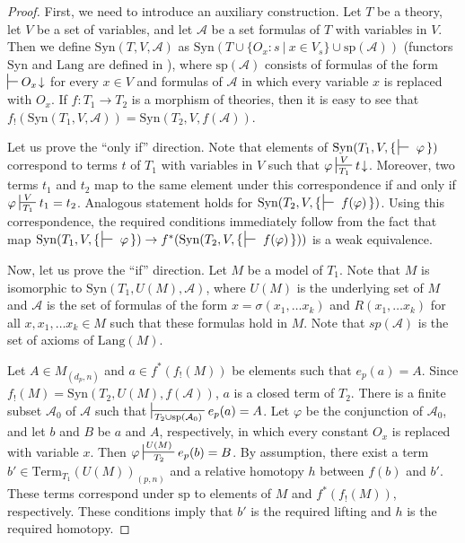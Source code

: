 \documentclass[reqno]{amsart}
\theoremstyle{definition}
\theoremstyle{remark}
\newcommand{\Syn}{\mathrm{Syn}}
\newcommand{\Lang}{\mathrm{Lang}}
\newcommand{\Term}{\mathrm{Term}}
\numberwithin{figure}{section}
\begin{document}
\begin{proof}
First, we need to introduce an auxiliary construction.
Let $T$ be a theory, let $V$ be a set of variables, and let $\mathcal{A}$ be a set formulas of $T$ with variables in $V$.
Then we define $\Syn(T,V,\mathcal{A})$ as $\Syn(T \cup \{ O_x : s\ |\ x \in V_s \} \cup \mathrm{sp}(\mathcal{A}))$ (functors $\Syn$ and $\Lang$ are defined in \cite{alg-models}),
where $\mathrm{sp}(\mathcal{A})$ consists of formulas of the form $\sststile{}{} O_x\!\downarrow$ for every $x \in V$
and formulas of $\mathcal{A}$ in which every variable $x$ is replaced with $O_x$.
If $f : T_1 \to T_2$ is a morphism of theories, then it is easy to see that $f_!(\Syn(T_1,V,\mathcal{A})) = \Syn(T_2,V,f(\mathcal{A}))$.

Let us prove the ``only if'' direction.
Note that elements of $\Syn(T_1, V, \{\,\sststile{}{}~\varphi\,\})$ correspond to terms $t$ of $T_1$ with variables in $V$ such that $\varphi \sststile{T_1}{V} t\!\downarrow$.
Moreover, two terms $t_1$ and $t_2$ map to the same element under this correspondence if and only if $\varphi \sststile{T_1}{V} t_1 = t_2$.
Analogous statement holds for $\Syn(T_2, V, \{\,\sststile{}{}~f(\varphi)\,\})$.
Using this correspondence, the required conditions immediately follow from the fact that
map $\Syn(T_1, V, \{\,\sststile{}{}~\varphi\,\}) \to f^*(\Syn(T_2, V, \{\,\sststile{}{}~f(\varphi)\,\}))$ is a weak equivalence.

Now, let us prove the ``if'' direction.
Let $M$ be a model of $T_1$.
Note that $M$ is isomorphic to $\Syn(T_1, U(M), \mathcal{A})$, where $U(M)$ is the underlying set of $M$ and $\mathcal{A}$ is the set of formulas of the form
$x = \sigma(x_1, \ldots x_k)$ and $R(x_1, \ldots x_k)$ for all $x, x_1, \ldots x_k \in M$ such that these formulas hold in $M$.
Note that $sp(\mathcal{A})$ is the set of axioms of $\Lang(M)$.

Let $A \in M_{(d_p,n)}$ and $a \in f^*(f_!(M))$ be elements such that $e_p(a) = A$.
Since $f_!(M) = \Syn(T_2, U(M), f(\mathcal{A}))$, $a$ is a closed term of $T_2$.
There is a finite subset $\mathcal{A}_0$ of $\mathcal{A}$ such that $\sststile{T_2 \cup \mathrm{sp}(\mathcal{A}_0)}{} e_p(a) = A$.
Let $\varphi$ be the conjunction of $\mathcal{A}_0$, and let $b$ and $B$ be $a$ and $A$, respectively, in which every constant $O_x$ is replaced with variable $x$.
Then $\varphi \sststile{T_2}{U(M)} e_p(b) = B$.
By assumption, there exist a term $b' \in \Term_{T_1}(U(M))_{(p,n)}$ and a relative homotopy $h$ between $f(b)$ and $b'$.
These terms correspond under $\mathrm{sp}$ to elements of $M$ and $f^*(f_!(M))$, respectively.
These conditions imply that $b'$ is the required lifting and $h$ is the required homotopy.
\end{proof}
\end{document}
